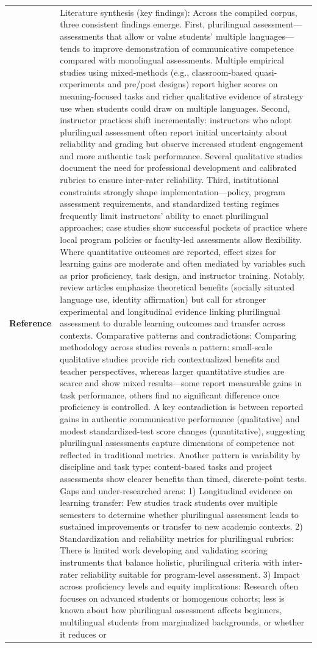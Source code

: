 \begin{longtable}{@{}l p{12.5cm}@{}}
  \textbf{Reference} & Literature synthesis (key findings): Across the compiled corpus, three consistent findings emerge. First, plurilingual assessment---assessments that allow or value students' multiple languages---tends to improve demonstration of communicative competence compared with monolingual assessments. Multiple empirical studies using mixed-methods (e.g., classroom-based quasi-experiments and pre/post designs) report higher scores on meaning-focused tasks and richer qualitative evidence of strategy use when students could draw on multiple languages. Second, instructor practices shift incrementally: instructors who adopt plurilingual assessment often report initial uncertainty about reliability and grading but observe increased student engagement and more authentic task performance. Several qualitative studies document the need for professional development and calibrated rubrics to ensure inter-rater reliability. Third, institutional constraints strongly shape implementation---policy, program assessment requirements, and standardized testing regimes frequently limit instructors' ability to enact plurilingual approaches; case studies show successful pockets of practice where local program policies or faculty-led assessments allow flexibility. Where quantitative outcomes are reported, effect sizes for learning gains are moderate and often mediated by variables such as prior proficiency, task design, and instructor training. Notably, review articles emphasize theoretical benefits (socially situated language use, identity affirmation) but call for stronger experimental and longitudinal evidence linking plurilingual assessment to durable learning outcomes and transfer across contexts. Comparative patterns and contradictions: Comparing methodology across studies reveals a pattern: small-scale qualitative studies provide rich contextualized benefits and teacher perspectives, whereas larger quantitative studies are scarce and show mixed results---some report measurable gains in task performance, others find no significant difference once proficiency is controlled. A key contradiction is between reported gains in authentic communicative performance (qualitative) and modest standardized-test score changes (quantitative), suggesting plurilingual assessments capture dimensions of competence not reflected in traditional metrics. Another pattern is variability by discipline and task type: content-based tasks and project assessments show clearer benefits than timed, discrete-point tests. Gaps and under-researched areas: 1) Longitudinal evidence on learning transfer: Few studies track students over multiple semesters to determine whether plurilingual assessment leads to sustained improvements or transfer to new academic contexts. 2) Standardization and reliability metrics for plurilingual rubrics: There is limited work developing and validating scoring instruments that balance holistic, plurilingual criteria with inter-rater reliability suitable for program-level assessment. 3) Impact across proficiency levels and equity implications: Research often focuses on advanced students or homogenous cohorts; less is known about how plurilingual assessment affects beginners, multilingual students from marginalized backgrounds, or whether it reduces or 
\end{longtable}
